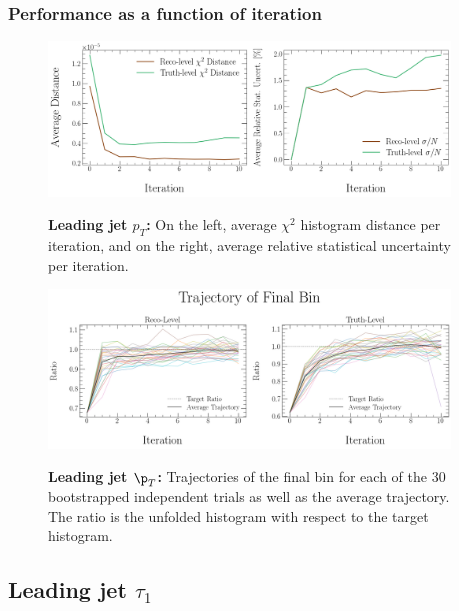 \subsubsection{Performance as a function of iteration}
\begin{figure}[!htb]
\centering
\includegraphics[width=0.95\textwidth]{figures/num_iterations_study/pT_trackj1/iteration_study_30x10-distances-and-stat-uncert.png}\\
\caption{\textbf{Leading jet $p_T$:} On the left, average $\chi^2$ histogram distance per iteration, and on the right, average relative statistical uncertainty per iteration.}
\label{fig:num_iterations:pT_distances_stat_uncert}
\end{figure}
\begin{figure}[!htb]
\centering
\includegraphics[width=0.95\textwidth]{figures/num_iterations_study/pT_trackj1/iteration_study_30x10-final_bin.png}\\
\caption{\textbf{Leading jet $\p_T$:} Trajectories of the final bin for each of the 30 bootstrapped independent trials as well as the average trajectory. The ratio is the unfolded histogram with respect to the target histogram.}
\label{fig:num_iterations:pT_final_bin}
\end{figure}

\subsection{Leading jet $\tau_1$}
